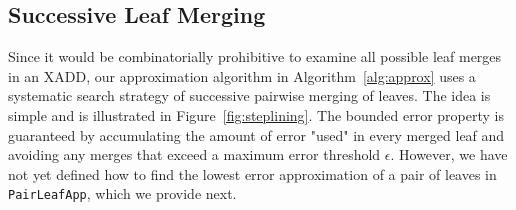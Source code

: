 \subsection{Successive Leaf Merging}


Since it would be combinatorially prohibitive to examine all possible
leaf merges in an XADD, our approximation algorithm in
Algorithm~\ref{alg:approx} uses a systematic search strategy of successive
pairwise merging of leaves. The idea is simple and is illustrated
in Figure~\ref{fig:steplining}. The bounded error property is
guaranteed by accumulating the amount of error "used" in every merged
leaf and avoiding any merges that exceed a maximum error threshold $\epsilon$.
However, we have not yet defined how to find the lowest error approximation
of a pair of leaves in \texttt{PairLeafApp}, which we provide next.

